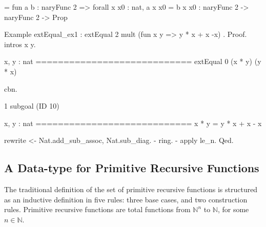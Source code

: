 \begin{Coqanswer}
     = fun a b : naryFunc 2 => forall x x0 : nat, a x x0 = b x x0
     : naryFunc 2 -> naryFunc 2 -> Prop
 \end{Coqanswer}
 
\begin{Coqsrc}
Example extEqual_ex1 : extEqual 2 mult (fun x y =>  y * x + x -x) .
Proof.
  intros x y.
\end{Coqsrc}

\begin{Coqanswer}
  x, y : nat
  ============================
  extEqual 0 (x * y) (y * x)
\end{Coqanswer}

\begin{Coqsrc}
  cbn.
\end{Coqsrc}

\begin{Coqanswer}
1 subgoal (ID 10)
  
  x, y : nat
  ============================
  x * y = y * x + x - x
\end{Coqanswer}

\begin{Coqsrc}
  rewrite <- Nat.add_sub_assoc, Nat.sub_diag.
  - ring.
  - apply le_n.  
Qed.
\end{Coqsrc}

\subsection{A Data-type for Primitive Recursive Functions}

The traditional definition of the set of primitive recursive functions is structured as an inductive definition 
in five rules: three base cases, and two construction rules. Primitive recursive functions are total functions from $\mathbb{N}^n$ to
$\mathbb{N}$, for some $n\in\mathbb{N}$.

